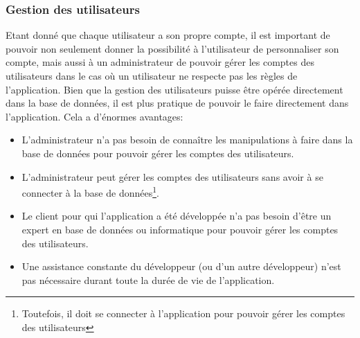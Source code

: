 \documentclass[12pt]{article}
\begin{document}
        \subsubsection{Gestion des utilisateurs}\label{subsubsec:gestion-des-utilisateurs}
        Etant donné que chaque utilisateur a son propre compte, il est important de pouvoir non seulement donner la possibilité
        à l'utilisateur de personnaliser son compte, mais aussi à un administrateur de pouvoir gérer les comptes des utilisateurs
        dans le cas où un utilisateur ne respecte pas les règles de l'application. Bien que la gestion des utilisateurs
        puisse être opérée directement dans la base de données, il est plus pratique de pouvoir le faire directement dans l'application.
        Cela a d'énormes avantages:
        \begin{itemize}
            \item L'administrateur n'a pas besoin de connaître les manipulations à faire dans la base de données pour pouvoir gérer les comptes des utilisateurs.
            \item L'administrateur peut gérer les comptes des utilisateurs sans avoir à se connecter à la base de données\footnote{Toutefois, il doit se connecter à l'application pour pouvoir gérer les comptes des utilisateurs}.
            \item Le client pour qui l'application a été développée n'a pas besoin d'être un expert en base de données ou informatique pour pouvoir gérer les comptes des utilisateurs.
            \item Une assistance constante du développeur (ou d'un autre développeur) n'est pas nécessaire durant toute la durée de vie de l'application.
        \end{itemize}
\end{document}

